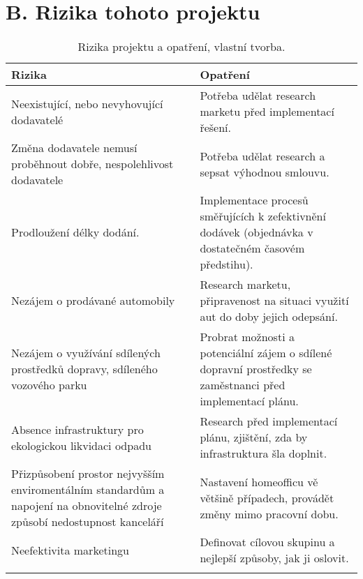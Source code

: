 
\newpage

\section*{B. Rizika tohoto projektu}
\label{sec:Rizika tohoto projektu a ocekavany prinos}

\begin{table}[h]
\centering
\begin{tabularx}{\textwidth}{X|X}
\thickhline
Rizika & Opatření \\ \hline
Neexistující, nebo nevyhovující dodavatelé & Potřeba udělat research marketu před implementací řešení. \\
Změna dodavatele nemusí proběhnout dobře, \newline nespolehlivost dodavatele & Potřeba udělat research a sepsat výhodnou smlouvu. \\
Prodloužení délky dodání. & Implementace procesů směřujících k zefektivnění dodávek (objednávka v dostatečném časovém předstihu). \\
Nezájem o prodávané automobily & Research marketu, připravenost na situaci využití aut do doby jejich odepsání. \\
Nezájem o využívání sdílených prostředků dopravy, sdíleného vozového parku & Probrat možnosti a potenciální zájem o sdílené dopravní prostředky se zaměstnanci před implementací plánu. \\
Absence infrastruktury pro ekologickou likvidaci odpadu & Research před implementací plánu, zjištění, zda by infrastruktura šla doplnit. \\
Přizpůsobení prostor nejvyšším enviromentálním standardům a napojení na obnovitelné zdroje způsobí nedostupnost kanceláří & Nastavení homeofficu vě většině případech, provádět změny mimo pracovní dobu. \\
Neefektivita marketingu & Definovat cílovou skupinu a nejlepší způsoby, jak ji oslovit. \\ \thickhline
\end{tabularx}
\caption[Rizika projektu a opatření]{Rizika projektu a opatření, vlastní tvorba.}
\label{tab:Rizika projektu a opatreni}
\end{table}